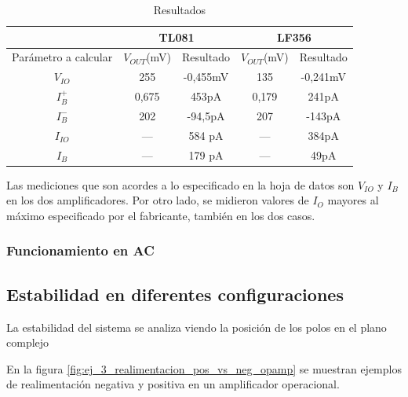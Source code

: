 \documentclass[../../main.tex]{subfiles}
\begin{document}
\begin{table}[htbp]
\centering
\begin{tabular}{ccccc}
                       & \multicolumn{2}{c}{TL081} & \multicolumn{2}{c}{LF356} \\
\hline
Par\'ametro a calcular & $V_{OUT}$(mV)& Resultado  & $V_{OUT}$(mV)& Resultado  \\
\hline
$V_{IO}$               & 255          & -0,455mV   & 135          & -0,241mV   \\
$I_B^+$                & 0,675        & 453pA      & 0,179        & 241pA      \\
$I_B^-$                & 202          & -94,5pA    & 207          & -143pA     \\
$I_{IO}$			   &     ---      & 584 pA	   &	  ---     & 384pA      \\
$I_B$				   &     ---      & 179 pA     &      ---     & 49pA
\end{tabular}%

\caption{Resultados}
\label{tab:ej_3_resultados}
\end{table}

Las mediciones que son acordes a lo especificado en la hoja de datos son $V_{IO}$  y $I_B$ en los dos amplificadores. Por otro lado, se midieron valores de $I_O$ mayores al m\'aximo especificado por el fabricante, tambi\'en en los dos casos.



\subsubsection{Funcionamiento en AC}





















\subsection{Estabilidad en diferentes configuraciones}




La estabilidad del sistema se analiza viendo la posici\'on de los polos en el plano complejo


En la figura \ref{fig:ej_3_realimentacion_pos_vs_neg_opamp} se muestran ejemplos de realimentaci\'on negativa y positiva en un amplificador operacional.
\end{document}
